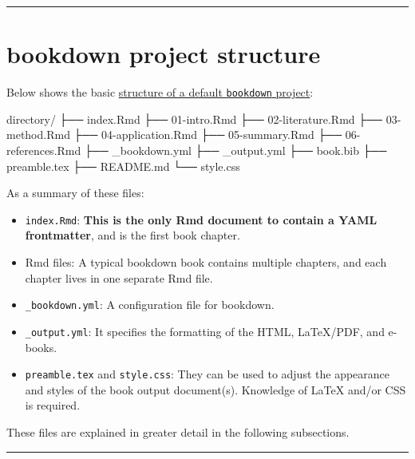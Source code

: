 \documentclass[
  a4paper,
  twoside,
  openright]{book}
\newenvironment{Shaded}{\begin{snugshade}}{\end{snugshade}}
\newcommand{\NormalTok}[1]{#1}
\theoremstyle{definition}
\theoremstyle{definition}
\theoremstyle{definition}
\theoremstyle{definition}
\theoremstyle{remark}
\begin{document}
\begin{center}\rule{0.5\linewidth}{0.5pt}\end{center}

\section{bookdown project structure}\label{bookdown-project-structure}

Below shows the basic \href{https://bookdown.org/yihui/rmarkdown/bookdown-project.html}{structure of a default \texttt{bookdown} project}:

\begin{Shaded}
\begin{Highlighting}[]
\NormalTok{directory/}
\NormalTok{├──  index.Rmd}
\NormalTok{├── 01{-}intro.Rmd}
\NormalTok{├── 02{-}literature.Rmd}
\NormalTok{├── 03{-}method.Rmd}
\NormalTok{├── 04{-}application.Rmd}
\NormalTok{├── 05{-}summary.Rmd}
\NormalTok{├── 06{-}references.Rmd}
\NormalTok{├── \_bookdown.yml}
\NormalTok{├── \_output.yml}
\NormalTok{├──  book.bib}
\NormalTok{├──  preamble.tex}
\NormalTok{├──  README.md}
\NormalTok{└──  style.css}
\end{Highlighting}
\end{Shaded}

As a summary of these files:

\begin{itemize}
\item
  \texttt{index.Rmd}: \textbf{This is the only Rmd document to contain a YAML frontmatter}, and is the first book chapter.
\item
  Rmd files: A typical bookdown book contains multiple chapters, and each chapter lives in one separate Rmd file.
\item
  \texttt{\_bookdown.yml}: A configuration file for bookdown.
\item
  \texttt{\_output.yml}: It specifies the formatting of the HTML, LaTeX/PDF, and e-books.
\item
  \texttt{preamble.tex} and \texttt{style.css}: They can be used to adjust the appearance and styles of the book output document(s). Knowledge of LaTeX and/or CSS is required.
\end{itemize}

These files are explained in greater detail in the following subsections.

\begin{center}\rule{0.5\linewidth}{0.5pt}\end{center}
\end{document}

